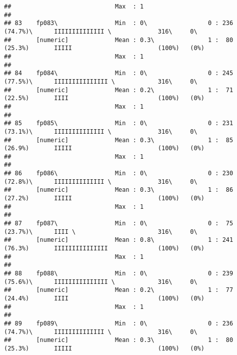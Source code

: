 \documentclass[]{article}
\begin{document}
\begin{verbatim}
##                             Max  : 1                                                                                       
## 
## 83    fp083\                Min  : 0\                 0 : 236 (74.7%)\      IIIIIIIIIIIIII \             316\     0\       
##       [numeric]             Mean : 0.3\               1 :  80 (25.3%)       IIIII                        (100%)   (0%)     
##                             Max  : 1                                                                                       
## 
## 84    fp084\                Min  : 0\                 0 : 245 (77.5%)\      IIIIIIIIIIIIIII \            316\     0\       
##       [numeric]             Mean : 0.2\               1 :  71 (22.5%)       IIII                         (100%)   (0%)     
##                             Max  : 1                                                                                       
## 
## 85    fp085\                Min  : 0\                 0 : 231 (73.1%)\      IIIIIIIIIIIIII \             316\     0\       
##       [numeric]             Mean : 0.3\               1 :  85 (26.9%)       IIIII                        (100%)   (0%)     
##                             Max  : 1                                                                                       
## 
## 86    fp086\                Min  : 0\                 0 : 230 (72.8%)\      IIIIIIIIIIIIII \             316\     0\       
##       [numeric]             Mean : 0.3\               1 :  86 (27.2%)       IIIII                        (100%)   (0%)     
##                             Max  : 1                                                                                       
## 
## 87    fp087\                Min  : 0\                 0 :  75 (23.7%)\      IIII \                       316\     0\       
##       [numeric]             Mean : 0.8\               1 : 241 (76.3%)       IIIIIIIIIIIIIII              (100%)   (0%)     
##                             Max  : 1                                                                                       
## 
## 88    fp088\                Min  : 0\                 0 : 239 (75.6%)\      IIIIIIIIIIIIIII \            316\     0\       
##       [numeric]             Mean : 0.2\               1 :  77 (24.4%)       IIII                         (100%)   (0%)     
##                             Max  : 1                                                                                       
## 
## 89    fp089\                Min  : 0\                 0 : 236 (74.7%)\      IIIIIIIIIIIIII \             316\     0\       
##       [numeric]             Mean : 0.3\               1 :  80 (25.3%)       IIIII                        (100%)   (0%)     

\end{verbatim}
\end{document}
